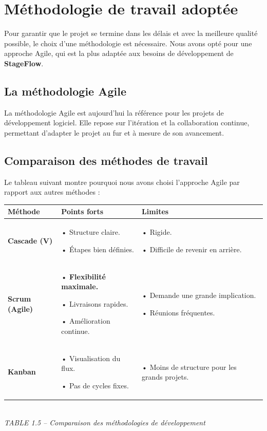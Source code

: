 \section{Méthodologie de travail adoptée}
Pour garantir que le projet se termine dans les délais et avec la meilleure qualité possible, le choix d'une méthodologie est nécessaire. Nous avons opté pour une approche Agile, qui est la plus adaptée aux besoins de développement de \textbf{StageFlow}.

\subsection{La méthodologie Agile}
La méthodologie Agile est aujourd'hui la référence pour les projets de développement logiciel. Elle repose sur l'itération et la collaboration continue, permettant d'adapter le projet au fur et à mesure de son avancement.

\subsection{Comparaison des méthodes de travail}
Le tableau suivant montre pourquoi nous avons choisi l'approche Agile par rapport aux autres méthodes :

\begin{center}
\begin{tabular}{|p{3cm}|p{6cm}|p{6cm}|}
\hline
\textbf{Méthode} & \textbf{Points forts} & \textbf{Limites} \\ \hline
\textbf{Cascade (V)} & • Structure claire. \par • Étapes bien définies. & • Rigide. \par • Difficile de revenir en arrière. \\ \hline
\textbf{Scrum (Agile)} & • \textbf{Flexibilité maximale.} \par • Livraisons rapides. \par • Amélioration continue. & • Demande une grande implication. \par • Réunions fréquentes. \\ \hline
\textbf{Kanban} & • Visualisation du flux. \par • Pas de cycles fixes. & • Moins de structure pour les grands projets. \\ \hline
\end{tabular}
\\[10pt] 
\textit{\small TABLE 1.5 – Comparaison des méthodologies de développement}
\end{center}
